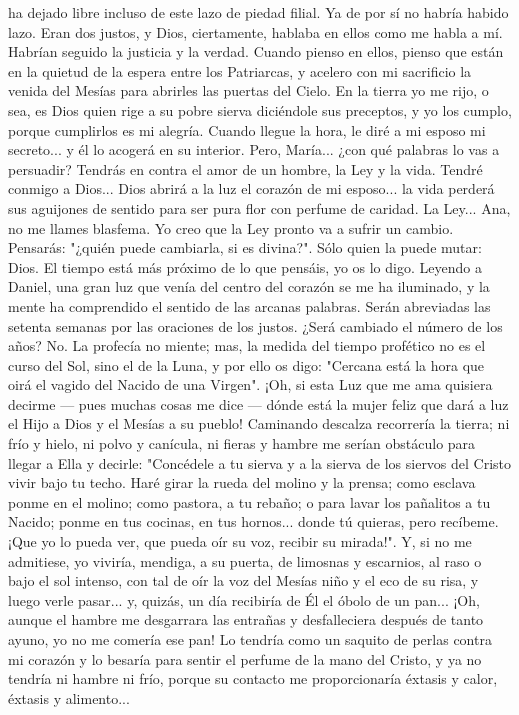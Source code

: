 \documentclass[12pt]{book} %
\begin{document}
ha dejado libre incluso de este lazo de piedad filial. Ya de por sí no habría habido lazo. Eran dos justos, y Dios, ciertamente, hablaba en ellos como me habla a mí. Habrían seguido la justicia y la verdad. Cuando pienso en ellos, pienso que están en la quietud de la espera entre los Patriarcas, y acelero con mi sacrificio la venida del Mesías para abrirles las puertas del Cielo. En la tierra yo me rijo, o sea, es Dios quien rige a su pobre sierva diciéndole sus preceptos, y yo los cumplo, porque cumplirlos es mi alegría. Cuando llegue la hora, le diré a mi esposo mi secreto... y él lo acogerá en su interior. 
Pero, María... ¿con qué palabras lo vas a persuadir? Tendrás en contra el amor de un hombre, la Ley y la vida. 
Tendré conmigo a Dios... Dios abrirá a la luz el corazón de mi esposo... la vida perderá sus aguijones de sentido para ser pura flor con perfume de caridad. La Ley... Ana, no me llames blasfema. Yo creo que la Ley pronto va a sufrir un cambio. Pensarás: "¿quién puede cambiarla, si es divina?". Sólo quien la puede mutar: Dios. El tiempo está más próximo de lo que pensáis, yo os lo digo. Leyendo a Daniel, una gran luz que venía del centro del corazón se me ha iluminado, y la mente ha comprendido el sentido de las arcanas palabras. Serán abreviadas las setenta semanas por las oraciones de los justos. ¿Será cambiado el número de los años? No. La profecía no miente; mas, la medida del tiempo profético no es el curso del Sol, sino el de la Luna, y por ello os digo: "Cercana está la hora que oirá el vagido del Nacido de una Virgen". ¡Oh, si esta Luz que me ama quisiera decirme — pues muchas cosas me dice — dónde está la mujer feliz que dará a luz el Hijo a Dios y el Mesías a su pueblo! Caminando descalza recorrería la tierra; ni frío y hielo, ni polvo y canícula, ni fieras y hambre me serían obstáculo para llegar a Ella y decirle: "Concédele a tu sierva y a la sierva de los siervos del Cristo vivir bajo tu techo. Haré girar la rueda del molino y la prensa; como esclava ponme en el molino; como pastora, a tu rebaño; o para lavar los pañalitos a tu Nacido; ponme en tus cocinas, en tus hornos... donde tú quieras, pero recíbeme. ¡Que yo lo pueda ver, que pueda oír su voz, recibir su mirada!". Y, si no me admitiese, yo viviría, mendiga, a su puerta, de limosnas y escarnios, al raso o bajo el sol intenso, con tal de oír la voz del Mesías niño y el eco de su risa, y luego verle pasar... y, quizás, un día recibiría de Él el óbolo de un pan... ¡Oh, aunque el hambre me desgarrara las entrañas y desfalleciera después de tanto ayuno, yo no me comería ese pan! Lo tendría como un saquito de perlas contra mi corazón y lo besaría para sentir el perfume de la mano del Cristo, y ya no tendría ni hambre ni frío, porque su contacto me proporcionaría éxtasis y calor, éxtasis y alimento... 
\end{document}
